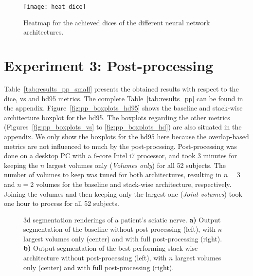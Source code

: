 \begin{figure}[htbp]	
	\centering
	\texttt{[image: heat\_dice]}
    \caption[Heatmap for the \acrlong{dice} of the different Architectures]{Heatmap for the achieved \acrlong{dice}s of the different neural network architectures.}
    \label{fig:results_heatmap_dice}
\end{figure}


\section{Experiment 3: Post-processing} \label{sec:exp_pp} %
Table~\ref{tab:results_pp_small} presents the obtained results with respect to the \acrlong{dice}, \acrlong{vs} and \acrlong{hd95} metrics. The complete Table~\ref{tab:results_pp} can be found in the appendix. Figure~\ref{fig:pp_boxplots_hd95} shows the baseline and stack-wise architecture boxplot for the \acrlong{hd95}. The boxplots regarding the other metrics (Figures~\ref{fig:pp_boxplots_vs} to \ref{fig:pp_boxplots_hd}) are also situated in the appendix. We only show the boxplots for the \gls{hd95} here because the overlap-based metrics are not influenced to much by the post-procssing.
Post-processing was done on a desktop PC with a 6-core Intel i7 processor, and took 3 minutes for keeping the $n$ largest volumes only (\textit{Volumes only}) for all 52 subjects. The number of volumes to keep was tuned for both architectures, resulting in $n = 3$ and $n = 2$ volumes for the baseline and stack-wise architecture, respectively. Joining the volumes and then keeping only the largest one (\textit{Joint volumes}) took one hour to process for all 52 subjects.



\begin{figure}[htbp]
	\centering
	\hfill
	\subfloat[]
	{
		\label{fig:subfig:pp_5to1_219}
		\texttt{[image: pp\_5to1\_219]}
	}
	\caption[Post-processing impact on Base and Stack]{\gls{3d} segmentation renderings of a patient's sciatic nerve. \textbf{a)} Output segmentation of the baseline without post-processing (left), with $n$ largest volumes only (center) and with full post-processing (right). \textbf{b)} Output segmentation of the best performing stack-wise architecture without post-processing (left), with $n$ largest volumes only (center) and with full post-processing (right).}
	\label{fig:pp_patient_219}  
\end{figure}


